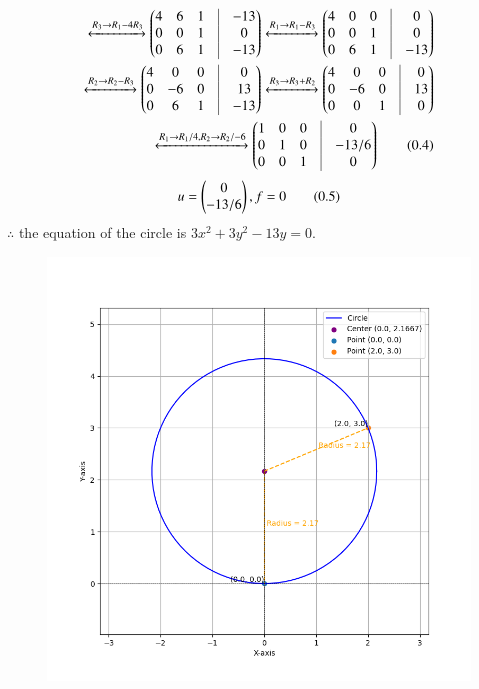 \documentclass[journal]{IEEEtran}
\begin{document}
\begin{align*}
	\xleftrightarrow[]{R_3 \rightarrow R_1-4R_3}
	 \myvec{4 & 6 & 1 & \vrule & -13\\
         0 &  0 & 1 & \vrule & 0\\
         0 &  6 & 1 & \vrule & -13} 
	 \xleftrightarrow[]{R_1\rightarrow R_1-R_3}
	 \myvec{4 & 0 & 0 & \vrule & 0\\
	 0 & 0 & 1 & \vrule & 0\\
	 0 & 6 & 1 &\vrule & -13}\\
	 \xleftrightarrow[]{R_2\rightarrow R_2-R_3}
	 \myvec{4 & 0 & 0 &\vrule & 0\\
	 0 & -6 & 0 & \vrule & 13 \\
	 0 & 6 & 1 & \vrule & -13}
	 \xleftrightarrow[]{R_3\rightarrow R_3+R_2}
	 \myvec{4 & 0 & 0 &\vrule & 0\\
	 0 & -6 & 0 & \vrule & 13 \\
	 0 & 0 & 1 & \vrule & 0}\\
	 \xleftrightarrow[]{R_1\rightarrow R_1/4, R_2 \rightarrow R_2/-6}
	 \myvec{1 & 0 & 0 &\vrule & 0\\
         0 & 1 & 0 & \vrule & -13/6 \\
	 0 & 0 & 1 & \vrule & 0} \tag{0.4}
\end{align*}
\begin{align*}
	 u=\begin{pmatrix}0 \\ -13/6\end{pmatrix},f=0 \tag{0.5}
\end{align*}
$\therefore$ the equation of the circle is $3x^2+3y^2-13y=0$.
\begin{table}[h!]    
  \centering
  
	\label{7-7.2-19}
\end{table}
\begin{figure}[h!]
	\centering
	\includegraphics[width=0.7\linewidth]{figs/Fig1.png}
\end{figure}
\end{document}
